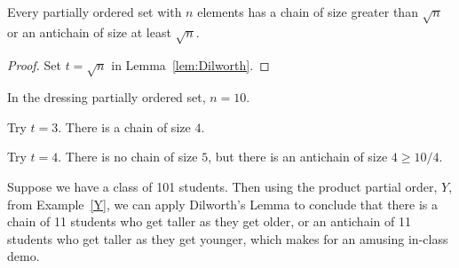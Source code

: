 \begin{corollary}\label{cor:Dilworth}
Every partially ordered set with $n$ elements has a chain of size greater
than $\sqrt{n}$ or an antichain of size at least $\sqrt{n}$.

\begin{proof}
  Set $t = \sqrt{n}$ in Lemma~\ref{lem:Dilworth}.
\end{proof}
\end{corollary}

\begin{example}
In the dressing partially ordered set, $n = 10$.

Try $t = 3$.  There is a chain of size $4$.

Try $t = 4$.  There is no chain of size $5$, but there is an antichain of
size $4 \geq 10 / 4$.
\end{example}

\begin{example}
Suppose we have a class of 101 students.  Then using the product partial
order, $Y$, from Example~\ref{Y}, we can apply Dilworth's Lemma to
conclude that there is a chain of 11 students who get taller as they get
older, or an antichain of 11 students who get taller as they get younger,
which makes for an amusing in-class demo.
\end{example}

\begin{problems}
\practiceproblems
{}

\classproblems
{}

\homeworkproblems
{}
\end{problems}


\endinput
